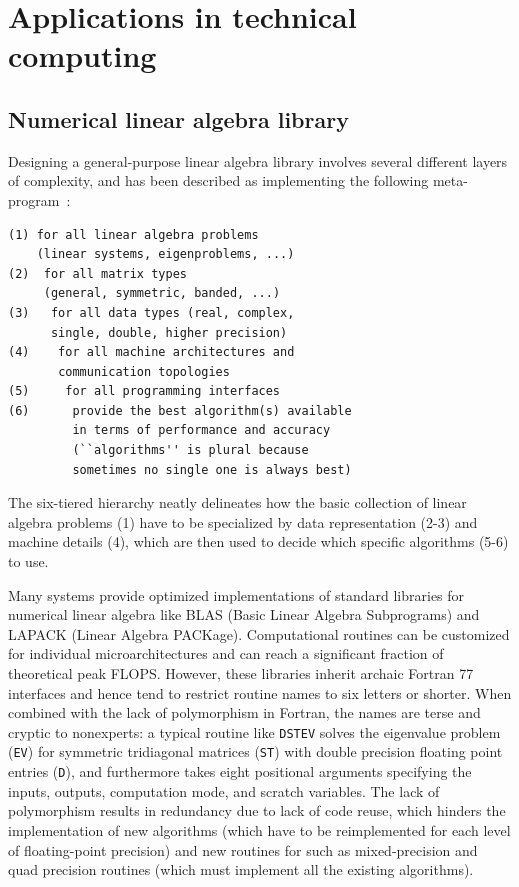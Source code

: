 \documentclass[pldi]{sigplanconf-pldi15}
\begin{document}
\section{Applications in technical computing}


\subsection{Numerical linear algebra library}

Designing a general-purpose linear algebra library involves several different
layers of complexity, and has been described as implementing the following
meta-program~\cite{Demmel2007}:

{\small
\begin{verbatim}
(1) for all linear algebra problems
    (linear systems, eigenproblems, ...)
(2)  for all matrix types
     (general, symmetric, banded, ...)
(3)   for all data types (real, complex,
      single, double, higher precision)
(4)    for all machine architectures and
       communication topologies
(5)     for all programming interfaces
(6)      provide the best algorithm(s) available
         in terms of performance and accuracy
         (``algorithms'' is plural because
         sometimes no single one is always best)
\end{verbatim}
}
%
The six-tiered hierarchy neatly delineates how the basic collection of linear
algebra problems (1) have to be specialized by data representation (2-3) and
machine details (4), which are then used to decide which specific algorithms
(5-6) to use.

Many systems provide optimized implementations of standard libraries for
numerical linear algebra like BLAS (Basic Linear Algebra Subprograms) and
LAPACK (Linear Algebra PACKage). Computational routines can be customized
for individual microarchitectures and can reach a significant fraction of
theoretical peak FLOPS. However, these libraries inherit archaic Fortran 77
interfaces and hence tend to restrict routine names to six letters or shorter.
When combined with the lack of polymorphism in Fortran, the names are terse and
cryptic to nonexperts: a typical routine like \verb|DSTEV| solves the
eigenvalue problem (\verb|EV|) for symmetric tridiagonal matrices (\verb|ST|)
with double precision floating point entries (\verb|D|), and furthermore takes
eight positional arguments specifying the inputs, outputs, computation mode,
and scratch variables. The lack of polymorphism results in redundancy due to
lack of code reuse, which hinders the implementation of new algorithms (which
have to be reimplemented for each level of floating-point precision) and new
routines for such as mixed-precision and quad precision routines (which must
implement all the existing algorithms).
\end{document}
